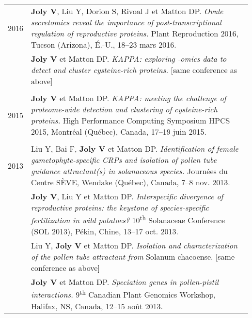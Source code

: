 \documentclass[letterpaper,10pt]{article}
\begin{document}
{\begin{tabular}{r|p{14.1cm}}
2016 

& \textbf{Joly V}, Liu Y, Dorion S, Rivoal J et Matton DP. \emph{Ovule secretomics reveal the importance of post-transcriptional regulation of reproductive proteins.} Plant Reproduction 2016, Tucson (Arizona), É.-U., 18--23 mars 2016. \vspace{1.5mm}  \\

& \textbf{Joly V} et Matton DP. \emph{KAPPA: exploring -omics data to detect and cluster cysteine-rich proteins.} [same conference as above] \\

\multicolumn{2}{c}{} \\

2015

& \textbf{Joly V} et Matton DP. \emph{KAPPA: meeting the challenge of proteome-wide detection and clustering of cysteine-rich proteins.} High Performance Computing Symposium HPCS 2015, Montréal (Québec), Canada, 17--19 juin 2015. \\

\multicolumn{2}{c}{} \\

2013

& Liu Y, Bai F, \textbf{Joly V} et Matton DP. \emph{Identification of female gametophyte-specific CRPs and isolation of pollen tube guidance attractant(s) in solanaceous species.} Journées du Centre SÈVE, Wendake (Québec), Canada, 7--8 nov. 2013. \vspace{1.5mm} \\

& \textbf{Joly V}, Liu Y et Matton DP. \emph{Interspecific divergence of reproductive proteins: the keystone of species-specific fertilization in wild potatoes?} 10\textsuperscript{th} Solanaceae Conference (SOL 2013), Pékin, Chine, 13--17 oct. 2013. \vspace{1.5mm} \\

& Liu Y, \textbf{Joly V} et Matton DP. \emph{Isolation and characterization of the pollen tube attractant from} Solanum chacoense. [same conference as above] \vspace{1.5mm} \\

& \textbf{Joly V} et Matton DP. \emph{Speciation genes in pollen-pistil interactions.} 9\textsuperscript{th} Canadian Plant Genomics Workshop, Halifax, NS, Canada, 12--15 août 2013. \\


\end{tabular}}
\end{document}
